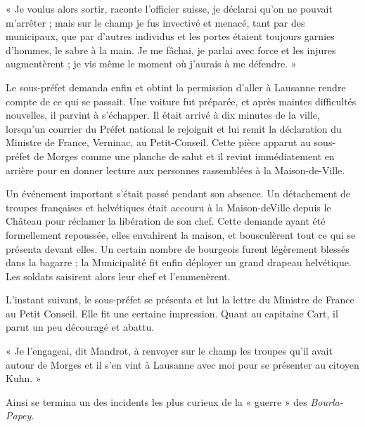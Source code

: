 \documentclass[french,twoside]{book} %
\newenvironment{quoteblock}%
  {\begin{quoting}}
  {\end{quoting}}
\newenvironment{quotebar}{%
    \def\FrameCommand{{\color{rubric!10!}\vrule width 0.5em} \hspace{0.9em}}%
    \def\OuterFrameSep{\itemsep} %
    \MakeFramed {\advance\hsize-\width \FrameRestore}
  }%
  {%
    \endMakeFramed
  }
\renewenvironment{quoteblock}%
  {%
    \savenotes
    \setstretch{0.9}
    \begin{quotebar}
  }
  {%
    \end{quotebar}
    \spewnotes
  }
\begin{document}
\begin{quoteblock}
 \noindent « Je voulus alors sortir, raconte l’officier suisse, je déclarai qu’on ne pouvait m’arrêter ; mais sur le champ je fus invectivé et menacé, tant par des municipaux, que par d’autres individus et les portes étaient toujours garnies d’hommes, le sabre à la main. Je me fâchai, je parlai avec force et les injures augmentèrent ; je vis même le moment où j’aurais à me défendre. »
 \end{quoteblock}

\noindent Le sous-préfet demanda enfin et obtint la permission d’aller à Lausanne rendre compte de ce qui se passait. Une voiture fut préparée, et après maintes difficultés nouvelles, il parvint à s’échapper. Il était arrivé à dix minutes de la ville, lorsqu’un courrier du Préfet national le rejoignit et lui remit la déclaration du Ministre de France, Verninac, au Petit-Conseil. Cette pièce apparut au sous-préfet de Morges comme une planche de salut et il revint immédiatement en arrière pour en donner lecture aux personnes rassemblées à la Maison-de-Ville.\par
Un événement important s’était passé pendant son absence. Un détachement de troupes françaises et helvétiques était accouru à la Maison-deVille depuis le Château pour réclamer la libération de son chef. Cette demande ayant été formellement repoussée, elles envahirent la maison, et bousculèrent tout ce qui se présenta devant elles. Un certain nombre de bourgeois furent légèrement blessés dans la bagarre ; la Municipalité fit enfin déployer un grand drapeau helvétique. Les soldats saisirent alors leur chef et l’emmenèrent.\par
L’instant suivant, le sous-préfet se présenta et lut la lettre du Ministre de France au Petit Conseil. Elle fit une certaine impression. Quant au capitaine Cart, il parut un peu découragé et abattu.\par

\begin{quoteblock}
 \noindent « Je l’engageai, dit Mandrot, à renvoyer sur le champ les troupes qu’il avait autour de Morges et il s’en vint à Lausanne avec moi pour se présenter au citoyen Kuhn. »
 \end{quoteblock}

\noindent Ainsi se termina un des incidents les plus curieux de la « guerre » des \emph{Bourla-Papey.}
\end{document}
